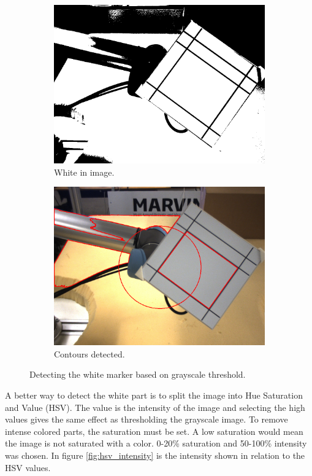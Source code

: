 \begin{figure}
 \centering
 \begin{subfigure}{0.49\linewidth}
 \includegraphics[width=\linewidth]{graphics/threshold_white}
 \caption{White in image.}
 \end{subfigure}
 \begin{subfigure}{0.49\linewidth}
 \includegraphics[width=\linewidth]{graphics/threshold_white_contours}
 \caption{Contours detected.}
 \end{subfigure}
 \caption{Detecting the white marker based on grayscale threshold.}
 \label{fig:threshold_marker1}
\end{figure}

A better way to detect the white part is to split the image into Hue Saturation and Value (HSV).
The value is the intensity of the image and selecting the high values gives the same effect as thresholding the grayscale image.
To remove intense colored parts, the saturation must be set. A low saturation would mean the image is not saturated with a color.
0-20\% saturation and 50-100\% intensity was chosen.
In figure \ref{fig:hsv_intensity} is the intensity shown in relation to the HSV values.

